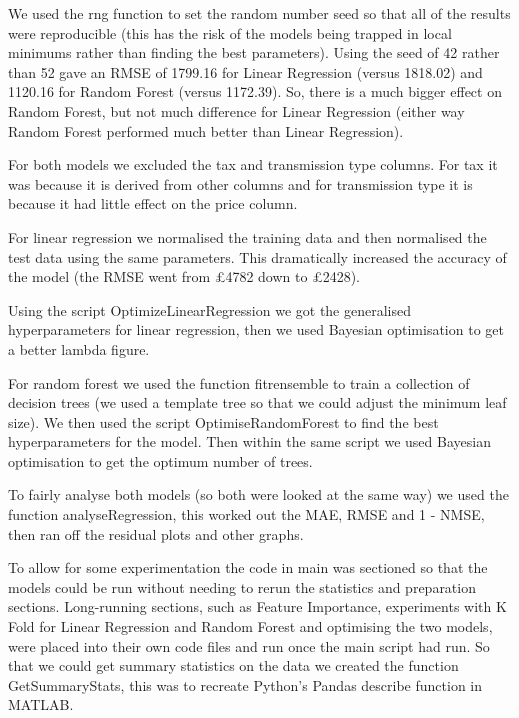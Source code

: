 \documentclass[a4pape, 11pt, english]{article}
\begin{document}
We used the rng function to set the random number seed so that all of the results were reproducible (this has the risk of the models being trapped in local minimums rather than finding the best parameters). Using the seed of 42 rather than 52 gave an RMSE of 1799.16 for Linear Regression (versus 1818.02) and 1120.16 for Random Forest (versus 1172.39). So, there is a much bigger effect on Random Forest, but not much difference for Linear Regression (either way Random Forest performed much better than Linear Regression).

For both models we excluded the tax and transmission type columns. For tax it was because it is derived from other columns and for transmission type it is because it had little effect on the price column.

For linear regression we normalised the training data and then normalised the test data using the same parameters. This dramatically increased the accuracy of the model (the RMSE went from £4782 down to £2428).

Using the script OptimizeLinearRegression we got the generalised hyperparameters for linear regression, then we used Bayesian optimisation to get a better lambda figure.

For random forest we used the function fitrensemble to train a collection of decision trees (we used a template tree so that we could adjust the minimum leaf size). We then used the script OptimiseRandomForest to find the best hyperparameters for the model. Then within the same script we used Bayesian optimisation to get the optimum number of trees.

To fairly analyse both models (so both were looked at the same way) we used the function analyseRegression, this worked out the MAE, RMSE and 1 - NMSE, then ran off the residual plots and other graphs.

To allow for some experimentation the code in main was sectioned so that the models could be run without needing to rerun the statistics and preparation sections. Long-running sections, such as Feature Importance, experiments with K Fold for Linear Regression and Random Forest and optimising the two models, were placed into their own code files and run once the main script had run.
So that we could get summary statistics on the data we created the function GetSummaryStats, this was to recreate Python's Pandas describe function in MATLAB. 




\end{document}
